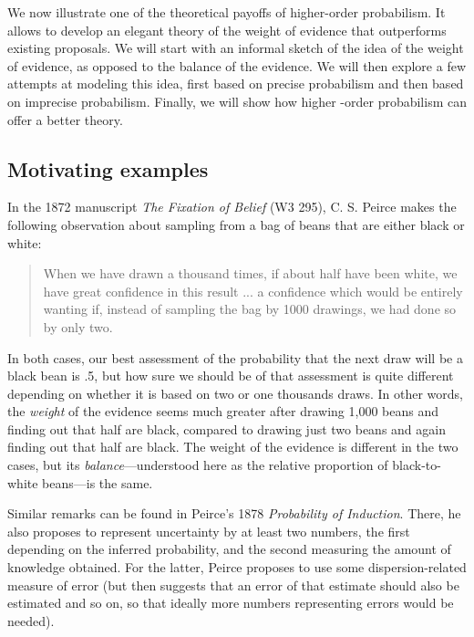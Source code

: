 \documentclass[
  10pt,
  dvipsnames,enabledeprecatedfontcommands]{scrartcl}
\begin{document}
We now illustrate one of the theoretical payoffs of higher-order
probabilism. It allows to develop an elegant theory of the weight of
evidence that outperforms existing proposals. We will start with an
informal sketch of the idea of the weight of evidence, as opposed to the
balance of the evidence. We will then explore a few attempts at modeling
this idea, first based on precise probabilism and then based on
imprecise probabilism. Finally, we will show how higher -order
probabilism can offer a better theory.

\hypertarget{motivating-examples}{%
\subsection{Motivating examples}\label{motivating-examples}}

In the 1872 manuscript \emph{The Fixation of Belief} (W3 295), C. S.
Peirce makes the following observation about sampling from a bag of
beans that are either black or white:

\begin{quote} When we have drawn a thousand times, if about half have been white, we have great confidence in this result ... a confidence which would be entirely wanting if, instead of sampling the bag by 1000 drawings, we had done so by only two.
\end{quote}

\noindent In both cases, our best assessment of the probability that the
next draw will be a black bean is .5, but how sure we should be of that
assessment is quite different depending on whether it is based on two or
one thousands draws. In other words, the \emph{weight} of the evidence
seems much greater after drawing 1,000 beans and finding out that half
are black, compared to drawing just two beans and again finding out that
half are black. The weight of the evidence is different in the two
cases, but its \emph{balance}---understood here as the relative
proportion of black-to-white beans---is the same.

Similar remarks can be found in Peirce's 1878
\emph{Probability of Induction}. There, he also proposes to represent
uncertainty by at least two numbers, the first depending on the inferred
probability, and the second measuring the amount of knowledge obtained.
For the latter, Peirce proposes to use some dispersion-related measure
of error (but then suggests that an error of that estimate should also
be estimated and so on, so that ideally more numbers representing errors
would be needed).
\end{document}
